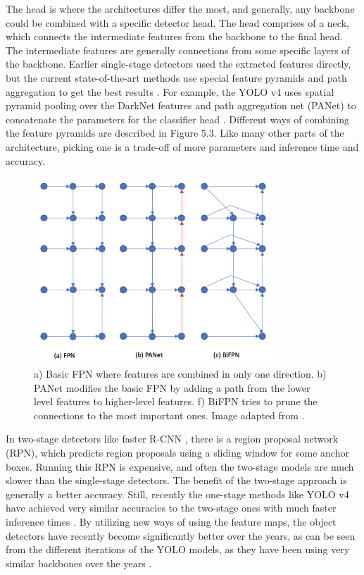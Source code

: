 The head is where the architectures differ the most, and generally, any backbone could be combined with a specific detector head.
The head comprises of a neck, which connects the intermediate features from the backbone to the final head.
The intermediate features are generally connections from some specific layers of the backbone.
Earlier single-stage detectors used the extracted features directly, but the current state-of-the-art methods use special feature pyramids and path aggregation to get the best results \citep{efficientDet}.
For example, the YOLO v4 uses spatial pyramid pooling \citep{SPP} over the DarkNet features and path aggregation net (PANet) \citep{PANET} to concatenate the parameters for the classifier head \citep{yolov4}.
Different ways of combining the feature pyramids are described in Figure 5.3.
Like many other parts of the architecture, picking one is a trade-off of more parameters and inference time and accuracy.
\begin{figure}[h!]
    \centering
    \includegraphics[width=0.8\textwidth]{imgs/detector_necks.png}
    \caption{a) Basic FPN \citep{FPN} where features are combined in only one direction. b) PANet modifies the basic FPN by adding a path from the lower level features to higher-level features. f) BiFPN tries to prune the connections to the most important ones. Image adapted from \citep{efficientDet}.}
\end{figure}

In two-stage detectors like faster R-CNN \citep{faster-rcnn}, there is a region proposal network (RPN), which predicts region proposals using a sliding window for some anchor boxes.
Running this RPN is expensive, and often the two-stage models are much slower than the single-stage detectors.
The benefit of the two-stage approach is generally a better accuracy. 
Still, recently the one-stage methods like YOLO v4 have achieved very similar accuracies to the two-stage ones with much faster inference times \citep{yolov4}.
By utilizing new ways of using the feature maps, the object detectors have recently become significantly better over the years, as can be seen from the different iterations of the YOLO models, as they have been using very similar backbones over the years \citep{yolov4}.

